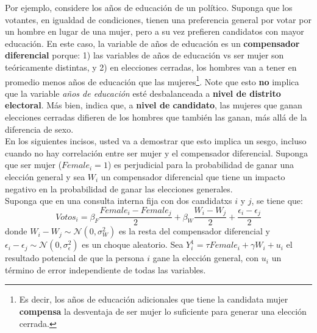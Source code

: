 \documentclass[a4paper, answers, addpoints, 11pt]{exam}
\begin{document}
Por ejemplo, considere los años de educación de un político. Suponga que los votantes, en igualdad de condiciones, tienen una preferencia general por votar por un hombre en lugar de una mujer, pero a su vez prefieren candidatos con mayor educación. En este caso, la variable de años de educación es un \textbf{compensador diferencial} porque: 1) las variables de años de educación vs ser mujer son teóricamente distintas, y 2) en elecciones cerradas, los hombres van a tener en promedio menos años de educación que las mujeres\footnote{Es decir, los años de educación adicionales que tiene la candidata mujer \textbf{compensa} la desventaja de ser mujer lo suficiente para generar una elección cerrada.}. Note que esto \textbf{no} implica que la variable \textit{años de educación} esté desbalanceada a \textbf{nivel de distrito electoral}. Más bien, indica que, a \textbf{nivel de candidato}, las mujeres que ganan elecciones cerradas difieren de los hombres que también las ganan, más allá de la diferencia de sexo.  \\

En los siguientes incisos, usted va a demostrar que esto implica un sesgo, incluso cuando no hay correlación entre ser mujer y el compensador diferencial. Suponga que ser mujer ($Female_i = 1$) es perjudicial para la probabilidad de ganar una elección general y sea $W_i$ un compensador diferencial que tiene un impacto negativo en la probabilidad de ganar las elecciones generales. \\

Suponga que en una consulta interna fija con dos candidatxs $i$ y $j$, se tiene que:
\vspace{0.2cm}
\begin{equation}
    Votos_i = \beta_F\frac{Female_i-Female_j}{2}+\beta_W\frac{W_i-W_j}{2}+\frac{\epsilon_i-\epsilon_j}{2}
\end{equation}
\vspace{0.2cm}
donde $W_i-W_j \sim \mathcal{N}(0, \sigma_W^2)$ es la resta del compensador diferencial y $\epsilon_i-\epsilon_j \sim \mathcal{N}( 0, \sigma_\epsilon^2)$ es un choque aleatorio. Sea $Y_i^1 = \tau Female_i + \gamma W_i + u_i$ el resultado potencial de que la persona $i$ gane la elección general, con $u_i$ un término de error independiente de todas las variables.

\bigskip
\end{document}
